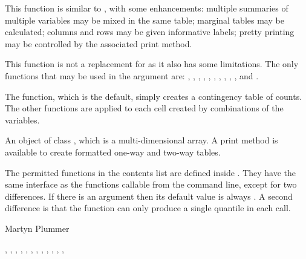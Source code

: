 \begin{Details}\relax
This function is similar to , with some enhancements:
multiple summaries of multiple variables may be mixed in the
same table; marginal tables may be calculated; columns and rows may
be given informative labels; pretty printing may be controlled by the
associated print method.

This function is not a replacement for  as it also has
some limitations.  The only functions that may be used in the
 argument  are: ,
, , ,
, , ,
, , , and
.

The  function, which is the default, simply creates a
contingency table of counts.  The other functions are applied to
each cell created by combinations of the  variables.
\end{Details}
\begin{Value}
An object of class , which is a multi-dimensional
array. A print method is available to create formatted one-way and
two-way tables.
\end{Value}
\begin{Note}\relax
The permitted functions in the contents list 
are defined inside .  They have the same interface as
the functions callable from the command line, except for two
differences. If there is an argument  then its default
value is always . A second difference is that the
 function can only produce a single quantile in each call.
\end{Note}
\begin{Author}\relax
Martyn Plummer
\end{Author}
\begin{SeeAlso}\relax
{}, ,
, ,
, ,
, ,
, , ,
, 
\end{SeeAlso}
